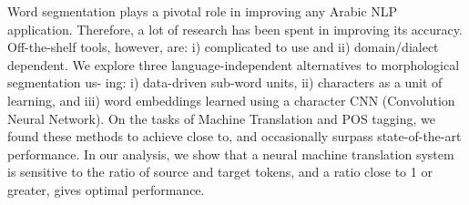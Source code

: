 Word segmentation plays a pivotal role in improving any Arabic NLP application. Therefore, a lot of research has been spent in improving its accuracy. Off-the-shelf tools, however, are: i) complicated to use and ii) domain/dialect dependent. We explore three language-independent alternatives to morphological segmentation us- ing: i) data-driven sub-word units, ii) characters as a unit of learning, and iii) word embeddings learned using a character CNN (Convolution Neural Network). On the tasks of Machine Translation and POS tagging, we found these methods to achieve close to, and occasionally surpass state-of-the-art performance. In our analysis, we show that a neural machine translation system is sensitive to the ratio of source and target tokens, and a ratio close to 1 or greater, gives optimal performance.
